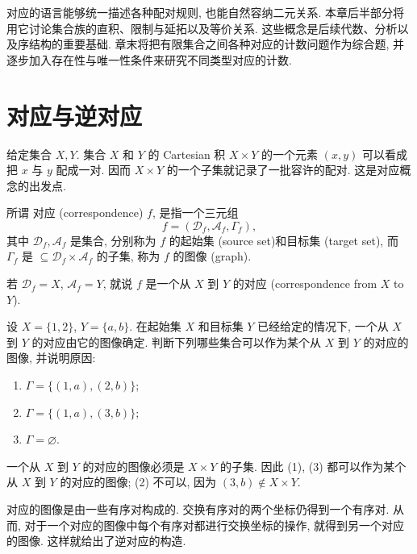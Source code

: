 \documentclass[usesamecnt, thmcnt=section, lang=cn, newtx, 10pt, scheme=chinese]{elegantbook}
\begin{document}
对应的语言能够统一描述各种配对规则, 也能自然容纳二元关系. 本章后半部分将用它讨论集合族的直积、限制与延拓以及等价关系. 这些概念是后续代数、分析以及序结构的重要基础. 章末将把有限集合之间各种对应的计数问题作为综合题, 并逐步加入存在性与唯一性条件来研究不同类型对应的计数.

\section{对应与逆对应}

给定集合 $X,Y$. 集合 $X$ 和 $Y$ 的 Cartesian 积 $X\times Y$ 的一个元素 $(x,y)$ 可以看成把 $x$ 与 $y$ 配成一对. 因而 $X\times Y$ 的一个子集就记录了一批容许的配对. 这是对应概念的出发点.

\begin{definition}[对应]\label{def:corr-correspondence}
所谓 {\color{blue}对应 (correspondence)} $f$, 是指一个三元组
\[
 f=(\mathscr D_f,\mathscr A_f,\Gamma_f),
\]
其中 $\mathscr D_f,\mathscr A_f$ 是集合, 分别称为 $f$ 的{\color{blue}起始集 (source set)}和{\color{blue}目标集 (target set)}, 而 $\Gamma_f$ 是 $
 \subseteq \mathscr D_f\times\mathscr A_f$ 的子集,
称为 $f$ 的{\color{blue}图像 (graph)}.

若 $\mathscr D_f=X$, $\mathscr A_f=Y$, 就说 $f$ 是一个{\color{blue}从 $X$ 到 $Y$ 的对应 (correspondence from $X$ to $Y$)}.
\end{definition}

\begin{concept}\label{con:corr-01}
设 $X=\{1,2\}$, $Y=\{a,b\}$. 在起始集 $X$ 和目标集 $Y$ 已经给定的情况下, 一个从 $X$ 到 $Y$ 的对应由它的图像确定. 判断下列哪些集合可以作为某个从 $X$ 到 $Y$ 的对应的图像, 并说明原因:
\begin{enumerate}[label=\rm(\arabic*)]
  \item $\Gamma=\{(1,a),(2,b)\}$;
  \item $\Gamma=\{(1,a),(3,b)\}$;
  \item $\Gamma=\varnothing$.
\end{enumerate}
\end{concept}

\begin{solution}
一个从 $X$ 到 $Y$ 的对应的图像必须是 $X\times Y$ 的子集. 因此 (1), (3) 都可以作为某个从 $X$ 到 $Y$ 的对应的图像; (2) 不可以, 因为 $(3,b)\notin X\times Y$.
\end{solution}

对应的图像是由一些有序对构成的. 交换有序对的两个坐标仍得到一个有序对. 从而, 对于一个对应的图像中每个有序对都进行交换坐标的操作, 就得到另一个对应的图像. 这样就给出了逆对应的构造.
\end{document}
